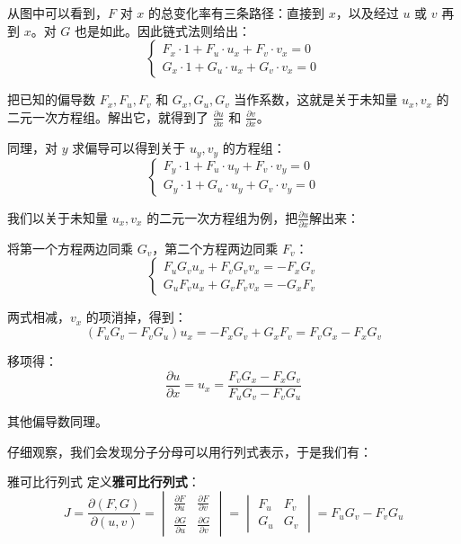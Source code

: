 从图中可以看到，$F$ 对 $x$ 的总变化率有三条路径：直接到 $x$，以及经过 $u$ 或 $v$ 再到 $x$。对 $G$ 也是如此。因此链式法则给出：
\[
\begin{cases}
F_x \cdot 1 + F_u \cdot u_x + F_v \cdot v_x = 0\\[4pt]
G_x \cdot 1 + G_u \cdot u_x + G_v \cdot v_x = 0
\end{cases}
\]

把已知的偏导数 $F_x,F_u,F_v$ 和 $G_x,G_u,G_v$ 当作系数，这就是关于未知量 $u_x,v_x$ 的二元一次方程组。解出它，就得到了 $\frac{\partial u}{\partial x}$ 和 $\frac{\partial v}{\partial x}$。

同理，对 $y$ 求偏导可以得到关于 $u_y,v_y$ 的方程组：
\[
\begin{cases}
F_y \cdot 1 + F_u \cdot u_y + F_v \cdot v_y = 0\\[4pt]
G_y \cdot 1 + G_u \cdot u_y + G_v \cdot v_y = 0
\end{cases}
\]

我们以关于未知量 $u_x,v_x$ 的二元一次方程组为例，把$\frac{\partial u}{\partial x}$解出来：

将第一个方程两边同乘 \(G_v\)，第二个方程两边同乘 \(F_v\)：
$$
\begin{cases}
F_u G_v u_x + F_v G_v v_x = -F_x G_v \\
G_u F_v u_x + G_v F_v v_x = -G_x F_v
\end{cases}
$$

两式相减，\(v_x\) 的项消掉，得到：
$$
(F_u G_v - F_v G_u) u_x = -F_x G_v + G_x F_v = F_v G_x - F_x G_v
$$

移项得：
$$
\frac{\partial u}{\partial x} = u_x = \frac{F_v G_x - F_x G_v}{F_u G_v - F_v G_u}
$$

其他偏导数同理。

仔细观察，我们会发现分子分母可以用行列式表示，于是我们有：

\begin{definition}{雅可比行列式}{}
  定义\textbf{雅可比行列式}：
  \[
J = \frac{\partial(F,G)}{\partial(u,v)} =
\begin{vmatrix}
\frac{\partial F}{\partial u} & \frac{\partial F}{\partial v} \\[6pt]
\frac{\partial G}{\partial u} & \frac{\partial G}{\partial v}
\end{vmatrix}
= 
\begin{vmatrix}
F_u & F_v \\
G_u & G_v
\end{vmatrix}
= F_u G_v - F_v G_u
\]

\end{definition}

